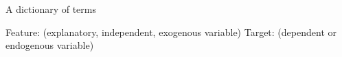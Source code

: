 A dictionary of terms

Feature: (explanatory, independent, exogenous variable)
Target: (dependent or endogenous variable)
